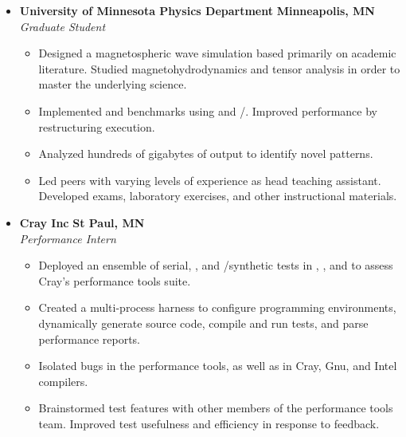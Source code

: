 
\begin{itemize}[leftmargin=\parindent]
        \parskip=0.1em
        \itemsep=1.5em

    \item[]
        \headerrow
        {\textbf{University of Minnesota Physics Department}}
        {\textbf{Minneapolis, MN}}
        \\
        \headerrow
        {\emph{Graduate Student}}
        {\emph{}}
        \begin{itemize}
            \item Designed a magnetospheric wave simulation based primarily on academic literature. Studied magnetohydrodynamics and tensor analysis in order to master the underlying science. 
            \item Implemented \CPP and \Fortran benchmarks using \OpenMP and \MPI/\OpenMP. Improved performance by restructuring execution. 
            \item Analyzed hundreds of gigabytes of output to identify novel patterns. 
            \item Led peers with varying levels of experience as head teaching assistant. Developed exams, laboratory exercises, and other instructional materials. 
        \end{itemize}

    \item[]
        \headerrow
        {\textbf{Cray Inc}}
        {\textbf{St Paul, MN}}
        \\
        \headerrow
        {\emph{Performance Intern}}
        {\emph{}}
        \begin{itemize}
            \item Deployed an ensemble of serial, \MPI, and \MPI/\OpenMP synthetic tests in \C, \CPP, and \Fortran to assess Cray's performance tools suite. 
            \item Created a multi-process \Python harness to configure programming environments, dynamically generate source code, compile and run tests, and parse performance reports. 
            \item Isolated bugs in the performance tools, as well as in Cray, Gnu, and Intel compilers. 
            \item Brainstormed test features with other members of the performance tools team. Improved test usefulness and efficiency in response to feedback. 


\end{itemize}
\end{itemize}
